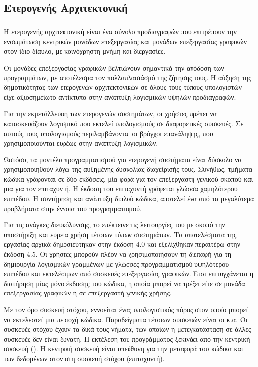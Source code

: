 \subsection{Ετερογενής Αρχιτεκτονική}
\subparagraph{}
Η ετερογενής αρχιτεκτονική είναι ένα σύνολο προδιαγραφών που επιτρέπουν την ενσωμάτωση κεντρικών μονάδων επεξεργασίας
\textbf{} και μονάδων επεξεργασίας γραφικών στον ίδιο δίαυλο, με κοινόχρηστη μνήμη και
διεργασίες\cite{toms_hardware}.

Οι μονάδες επεξεργασίας γραφικών βελτιώνουν σημαντικά την απόδοση των προγραμμάτων, με αποτέλεσμα τον πολλαπλασιάσμό της
ζήτησης τους. Η αύξηση της δημοτικότητας των ετερογενών αρχιτεκτονικών σε όλους τους τύπους υπολογιστών είχε
αξιοσημείωτο αντίκτυπο στην ανάπτυξη λογισμικών υψηλών προδιαγραφών.

Για την εκμετάλλευση των ετερογενών συστημάτων, οι χρήστες πρέπει να κατασκευάζουν λογισμικό που εκτελεί υπολογισμούς σε
διαφορετικές συσκευές. Σε αυτούς τους υπολογισμούς περιλαμβάνονται οι βρόγχοι επανάληψης, που χρησιμοποιούνται ευρέως
στην ανάπτυξη λογισμικών.

Ωστόσο, τα μοντέλα προγραμματισμού για ετερογενή συστήματα είναι δύσκολο να χρησιμοποιηθούν λόγω της αυξημένης δυσκολίας
διαχείρισής τους. Συνήθως, τμήματα κώδικα γράφονται σε δύο εκδόσεις, μία φορά για τον επεξεργαστή γενικού σκοπού και μια
για τον επιταχυντή. Η έκδοση του επιταχυντή γράφεται γλώσσα χαμηλότερου επιπέδου. Η συντήρηση και ανάπτυξη διπλού
κώδικα, αποτελεί ένα από τα μεγαλύτερα προβλήματα στην έννοια του προγραμματισμού.

Για τις ανάγκες διευκόλυνσης, το \emph{} επέκτεινε τις λειτουργίες του με σκοπό την υποστήριξη και ευρεία
χρήση τέτοιων τύπων συστημάτων\cite{barbara}. Τα αποτελέσματα της εργασίας αρχικά δημοσιεύτηκαν στην έκδοση 4.0 και
εξελίχθηκαν περαιτέρω στην έκδοση 4.5. Οι χρήστες μπορούν πλέον να χρησιμοποιήσουν τη διεπαφή για τη δημιουργία
λογισμικών γραμμένων με γλώσσες προγραμματισμού υψηλότερου επιπέδου και εκτελέσιμων από συσκευές επεξεργασίας γραφικών.
Ετσι επιτυγχάνεται η διατήρηση μίας μόνο έκδοσης του κώδικα, η οποία μπορεί να τρέξει είτε σε μονάδα επεξεργασίας
γραφικών ή σε επεξεργαστή γενικής χρήσης\emph{}.

Με τον όρο συσκευή στόχου, εννοείται ένας υπολογιστικός πόρος στον οποίο μπορεί να εκτελεστεί μια περιοχή κώδικα.
Παραδείγματα τέτοιων συσκευών είναι οι \emph{} κ.α. Οι συσκευές στόχου έχουν τα δικά τους νήματα,
των οποίων η μετεγκατάσταση σε άλλες συσκευές δεν είναι δυνατή. Η εκτέλεση του προγράμματος ξεκινάει από την κεντρική
συσκευή (\emph{}). Η κεντρική συσκευή είναι υπεύθυνη για την μεταφορά του κώδικα και των δεδομένων στον
στη συσκευή στόχου (επιταχυντή).

